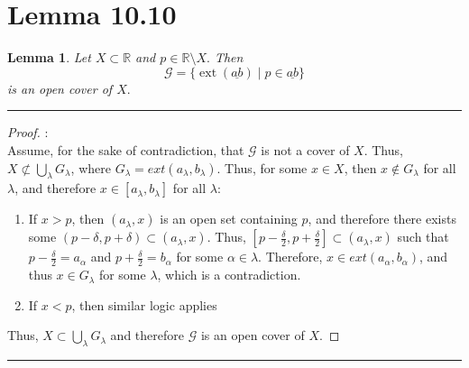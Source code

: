 \documentclass[openany, amssymb, psamsfonts]{amsart}
\newcommand{\bbR}{\mathbb{R}}
\DeclareMathOperator{\ext}{ext}
\newtheorem{lem}{Lemma}[section]
\theoremstyle{definition}
\numberwithin{equation}{section}
\begin{document}
\section*{Lemma 10.10}
\begin{lem}   
\label{10.10}
Let $X\subset \bbR$ and $p\in \bbR\setminus X.$ Then
\[
\mathcal{G} = \{ \ext(\underline{ab}) \mid p\in \underline{ab}  \}
\]
is an open cover of $X.$ 
\end{lem}
\vspace{4pt}     \hrule   \vspace{4pt} \begin{proof}:\\
Assume, for the sake of contradiction, that $\mathcal{G}$ is not a cover of $X$. Thus, $X\not \subset \bigcup_\lambda G_\lambda$, where $G_\lambda = ext(a_\lambda, b_\lambda)$. Thus, for some $x\in X$, then $x\notin G_\lambda$ for all $\lambda$, and therefore $x\in [a_\lambda, b_\lambda]$ for all $\lambda$:
\begin{enumerate}
\item If $x>p$, then $(a_\lambda, x)$ is an open set containing $p$, and therefore there exists some $(p-\delta, p+\delta)\subset (a_\lambda, x)$. Thus, $[p-\frac{\delta}{2}, p+\frac{\delta}{2}]\subset (a_\lambda, x)$ such that $p-\frac{\delta}{2} = a_\alpha$ and $p+\frac{\delta}{2} = b_\alpha$ for some $\alpha \in \lambda$. Therefore, $x\in ext(a_\alpha,b_\alpha)$, and thus $x\in G_\lambda$ for some $\lambda$, which is a contradiction.
\item If $x<p$, then similar logic applies
\end{enumerate}
Thus, $X\subset \bigcup_\lambda G_\lambda$ and therefore $\mathcal{G}$ is an open cover of $X$.
\end{proof}\vspace{4pt}     \hrule   \vspace{4pt}
\end{document}
